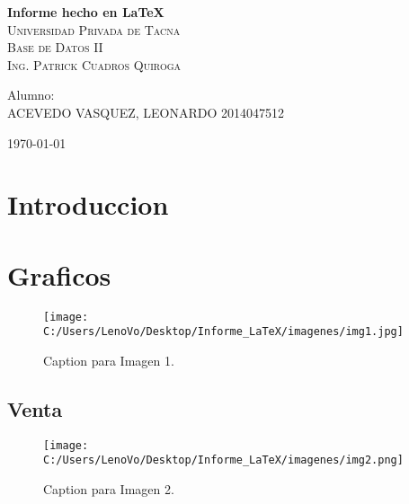 \documentclass[12pt]{article}
\begin{document}
\begin{titlepage}
	\begin{center}
	\Huge{\bfseries Informe hecho en LaTeX}\\
	[1.5cm]
	\textsc{\LARGE Universidad Privada de Tacna}\\
	[0.75cm]
	\textsc{\Large Base de Datos II}\\
	[0.25cm]
	\textsc{\large Ing. Patrick Cuadros Quiroga}\\
	[2.25cm]
	\end{center}
	\begin{flushleft}
	\LARGE{Alumno:\\
	[0.60cm]}
	\small{ACEVEDO VASQUEZ, LEONARDO \hfill 2014047512}\\
	\end{flushleft}
	
	\vspace{\fill}	
	\begin{center}
	\huge{\today}	
	\end{center}
\end{titlepage}

\tableofcontents
\thispagestyle{empty}
\newpage
\setcounter{page}{1}

\section{Introduccion}\label{sec:intro}
\lipsum[1]
\lipsum[1]
\newpage
\section{Graficos}\label{sec:fig}
\lipsum[2]

\begin{figure}[H]
	\centering
	\caption{Caption para Imagen 1.}
	\texttt{[image: C:/Users/LenoVo/Desktop/Informe\_LaTeX/imagenes/img1.jpg]}
	\label{fig:fig1}
\end{figure}
\subsection{Venta}\label{sec:sel}
\lipsum[3]
\begin{figure}[H]
	\centering
	\caption{Caption para Imagen 2.}
	\texttt{[image: C:/Users/LenoVo/Desktop/Informe\_LaTeX/imagenes/img2.png]}
\end{figure}
\newpage
\end{document}
